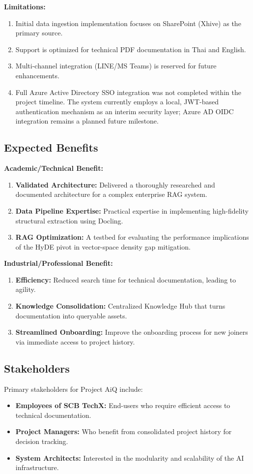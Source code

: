 \documentclass[12pt]{article}
\begin{document}
\textbf{Limitations:}
\begin{enumerate}
    \item Initial data ingestion implementation focuses on SharePoint (Xhive) as the primary source.
    \item Support is optimized for technical PDF documentation in Thai and English.
    \item Multi-channel integration (LINE/MS Teams) is reserved for future enhancements.
    \item Full Azure Active Directory SSO integration was not completed within the project timeline. The system currently employs a local, JWT-based authentication mechanism as an interim security layer; Azure AD OIDC integration remains a planned future milestone.
\end{enumerate}

\subsection{Expected Benefits}
\textbf{Academic/Technical Benefit:}
\begin{enumerate}
    \item \textbf{Validated Architecture:} Delivered a thoroughly researched and documented architecture for a complex enterprise RAG system.
    \item \textbf{Data Pipeline Expertise:} Practical expertise in implementing high-fidelity structural extraction using Docling.
    \item \textbf{RAG Optimization:} A testbed for evaluating the performance implications of the HyDE pivot in vector-space density gap mitigation.
\end{enumerate}

\textbf{Industrial/Professional Benefit:}
\begin{enumerate}
    \item \textbf{Efficiency:} Reduced search time for technical documentation, leading to agility.
    \item \textbf{Knowledge Consolidation:} Centralized Knowledge Hub that turns documentation into queryable assets.
    \item \textbf{Streamlined Onboarding:} Improve the onboarding process for new joiners via immediate access to project history.
\end{enumerate}

\subsection{Stakeholders}
Primary stakeholders for Project AiQ include:
\begin{itemize}
    \item \textbf{Employees of SCB TechX:} End-users who require efficient access to technical documentation.
    \item \textbf{Project Managers:} Who benefit from consolidated project history for decision tracking.
    \item \textbf{System Architects:} Interested in the modularity and scalability of the AI infrastructure.
\end{itemize}
\end{document}
